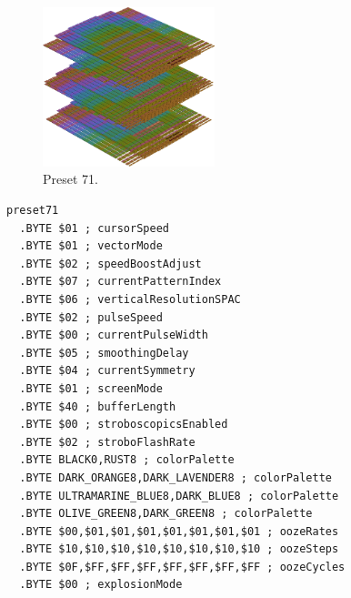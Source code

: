 \vspace*{0.5cm}
\begin{minipage}[b]{0.48\linewidth}
\begin{figure}[H]                                                          
  \centering                                                             
  \begin{adjustbox}{width=5cm,center}                                   
  \includegraphics[width=5cm]{src/colorspace_presets/preset71-45.png}%
  \end{adjustbox}                                                        
\caption*{Preset 71.}                                           
\end{figure}                                                               
\end{minipage}
\hspace{0.1cm}
\begin{minipage}[b]{0.48\linewidth}                                                                         
\begin{lstlisting}[basicstyle=\ttfamily\tiny]
preset71
  .BYTE $01 ; cursorSpeed
  .BYTE $01 ; vectorMode
  .BYTE $02 ; speedBoostAdjust
  .BYTE $07 ; currentPatternIndex
  .BYTE $06 ; verticalResolutionSPAC
  .BYTE $02 ; pulseSpeed
  .BYTE $00 ; currentPulseWidth
  .BYTE $05 ; smoothingDelay
  .BYTE $04 ; currentSymmetry
  .BYTE $01 ; screenMode
  .BYTE $40 ; bufferLength
  .BYTE $00 ; stroboscopicsEnabled
  .BYTE $02 ; stroboFlashRate
  .BYTE BLACK0,RUST8 ; colorPalette
  .BYTE DARK_ORANGE8,DARK_LAVENDER8 ; colorPalette
  .BYTE ULTRAMARINE_BLUE8,DARK_BLUE8 ; colorPalette
  .BYTE OLIVE_GREEN8,DARK_GREEN8 ; colorPalette
  .BYTE $00,$01,$01,$01,$01,$01,$01,$01 ; oozeRates
  .BYTE $10,$10,$10,$10,$10,$10,$10,$10 ; oozeSteps
  .BYTE $0F,$FF,$FF,$FF,$FF,$FF,$FF,$FF ; oozeCycles
  .BYTE $00 ; explosionMode
\end{lstlisting}
\end{minipage}


